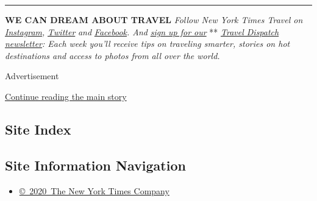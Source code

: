 \begin{center}\rule{0.5\linewidth}{\linethickness}\end{center}

\textbf{WE CAN DREAM ABOUT TRAVEL} \emph{Follow New York Times Travel
on}
\href{https://www.instagram.com/nytimestravel/}{\emph{Instagram}}\emph{,}
\href{https://twitter.com/nytimestravel}{\emph{Twitter}} \emph{and}
\href{https://www.facebook.com/nytimestravel/}{\emph{Facebook}}\emph{.
And}
\href{https://www.nytimes.com/newsletters/traveldispatch?action=click\&module=inline\&pgtype=Article}{\emph{sign
up for our}} **
\href{https://www.nytimes.com/newsletters/traveldispatch}{\emph{Travel
Dispatch newsletter}}\emph{: Each week you'll receive tips on traveling
smarter, stories on hot destinations and access to photos from all over
the world.}

Advertisement

\protect\hyperlink{after-bottom}{Continue reading the main story}

\hypertarget{site-index}{%
\subsection{Site Index}\label{site-index}}

\hypertarget{site-information-navigation}{%
\subsection{Site Information
Navigation}\label{site-information-navigation}}

\begin{itemize}
\tightlist
\item
  \href{https://help.nytimes.com/hc/en-us/articles/115014792127-Copyright-notice}{©~2020~The
  New York Times Company}
\end{itemize}

